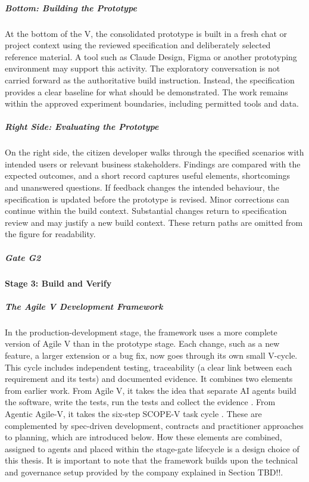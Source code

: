 \documentclass[10pt,a4paper]{article}
\begin{document}
\subparagraph{Bottom: Building the Prototype}

At the bottom of the V, the consolidated prototype is built in a fresh chat or project context using the reviewed specification and deliberately selected reference material. A tool such as Claude Design, Figma or another prototyping environment may support this activity. The exploratory conversation is not carried forward as the authoritative build instruction. Instead, the specification provides a clear baseline for what should be demonstrated. The work remains within the approved experiment boundaries, including permitted tools and data.

\subparagraph{Right Side: Evaluating the Prototype}

On the right side, the citizen developer walks through the specified scenarios with intended users or relevant business stakeholders. Findings are compared with the expected outcomes, and a short record captures useful elements, shortcomings and unanswered questions. If feedback changes the intended behaviour, the specification is updated before the prototype is revised. Minor corrections can continue within the build context. Substantial changes return to specification review and may justify a new build context. These return paths are omitted from the figure for readability.

\subparagraph{Gate G2}

\paragraph{Stage 3: Build and Verify}

\subparagraph{The Agile V Development Framework}


In the production-development stage, the framework uses a more complete version of Agile V than in the prototype stage. Each change, such as a new feature, a larger extension or a bug fix, now goes through its own small V-cycle. This cycle includes independent testing, traceability (a clear link between each requirement and its tests) and documented evidence. It combines two elements from earlier work. From Agile V, it takes the idea that separate AI agents build the software, write the tests, run the tests and collect the evidence \parencite{koch2026agile}. From Agentic Agile-V, it takes the six-step SCOPE-V task cycle \parencite{koch2026agentic}. These are complemented by spec-driven development, contracts and practitioner approaches to planning, which are introduced below. How these elements are combined, assigned to agents and placed within the stage-gate lifecycle is a design choice of this thesis. It is important to note that the framework builds upon the technical and governance setup provided by the company explained in Section TBD!!.
\end{document}
